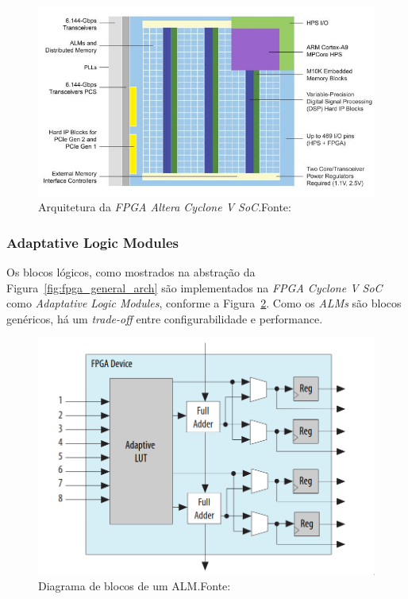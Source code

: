     \begin{figure}[H]
    \centering
    \includegraphics[width=1\linewidth]
        {../images/altera_cyclone_v_soc_architectural_downscale.jpg}
        \caption[Arquitetura da FPGA Intel Cyclone V SoC]
            {Arquitetura da \textit{FPGA Altera Cyclone V SoC}.\quad Fonte:~\cite{cyclone_v_soc}}
        \label{fig:cyclone_v_arch}
    \end{figure}

        \subsubsection{Adaptative Logic Modules}
        { Os blocos lógicos, como mostrados na abstração da Figura~\ref{fig:fpga_general_arch}
            são implementados na \textit{FPGA Cyclone V SoC} como
            \textit{Adaptative Logic Modules}, conforme a Figura~\ref{fig:fpga_alm}.
            Como os \textit{ALMs} são blocos genéricos, há um \textit{trade-off}
            entre configurabilidade e performance.
        }

        \begin{figure}[H]
        \centering
        \includegraphics[width=.7\linewidth]
            {../images/intel_alm_high_level.png}
            \caption[Diagrama de blocos de um ALM]
                {Diagrama de blocos de um ALM.\quad Fonte:~\cite{cyclone_alm}}
            \label{fig:fpga_alm}
        \end{figure}


